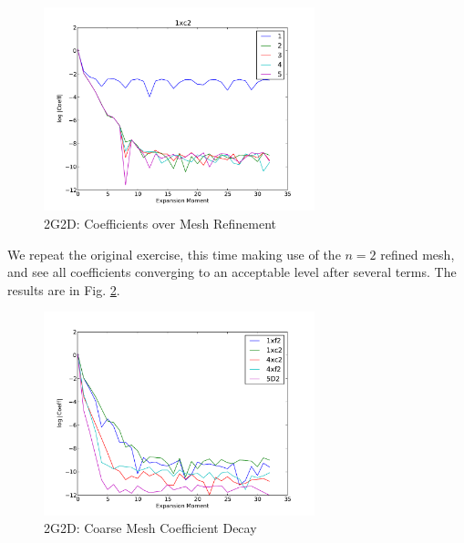 \begin{figure}[H]
\centering
   \includegraphics[width=0.7\textwidth]{../graphics/cof_decay_1xc2_meshes}
   \caption{2G2D: Coefficients over Mesh Refinement}
   \label{fig:2g2d 1xc2 cof decay}
\end{figure}
We repeat the original exercise, this time making use of the $n=2$ refined mesh, and see all coefficients converging to an acceptable level after several terms.  The results are in Fig. \ref{fig:2g2d5v fine cof}.
\begin{figure}[H]
\centering
   \includegraphics[width=0.7\textwidth]{../graphics/coefficient_decay2}
   \caption{2G2D: Coarse Mesh Coefficient Decay}
   \label{fig:2g2d5v fine cof}
\end{figure}